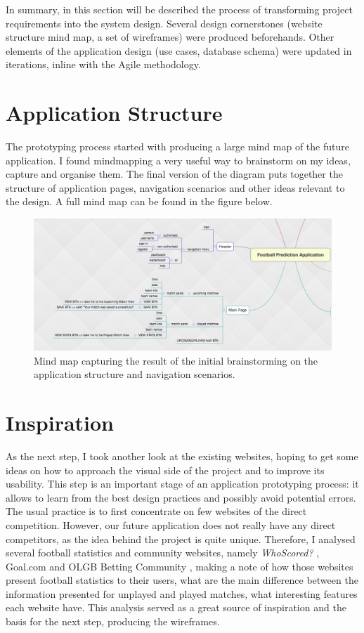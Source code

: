 In summary, in this section will be described the process of transforming project requirements into the system design. Several design cornerstones (website structure mind map, a set of wireframes) were produced beforehands. Other elements of the application design (use cases, database schema) were updated in iterations, inline with the Agile methodology. 

\section{Application Structure}
\label{sec:applicationstructure_prototype}
The prototyping process started with producing a large mind map of the future application. I found mindmapping a very useful way to brainstorm on my ideas, capture and organise them. The final version of the diagram puts together the structure of application pages, navigation scenarios and other ideas relevant to the design. A full mind map can be found in the figure below.

\begin{figure}[H]
	\begin{center}
		\includegraphics[width=.90\textwidth]{design/images/mindmap}
		\caption{Mind map capturing the result of the initial brainstorming on the application structure and navigation scenarios.} \label{fig:using:mindmap}
	\end{center}
\end{figure}

\section{Inspiration}
\label{sec:inspiration_prototype}
As the next step, I took another look at the existing websites, hoping to get some ideas on how to approach the visual side of the project and to improve its usability. This step is an important stage of an application prototyping process: it allows to learn from the best design practices and possibly avoid potential errors. The usual practice is to first concentrate on few websites of the direct competition. However, our future application does not really have any direct competitors, as the idea behind the project is quite unique. Therefore, I analysed several football statistics and community websites, namely \emph{WhoScored?} \citep{source:whoscored}, {Goal.com} \citep{source:goal} and OLGB Betting Community \citep{source:olgb}, making a note of how those websites present football statistics to their users, what are the main difference between the information presented for unplayed and played matches, what interesting features each website have. This analysis served as a great source of inspiration and the basis for the next step, producing the wireframes.

